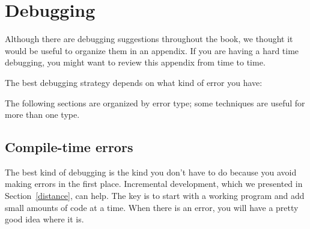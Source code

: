 \documentclass[12pt]{book}
\theoremstyle{exercise}
\newcommand{\java}{\verb}%}
\begin{document}
\chapter{Debugging}
\label{debugappendix}


Although there are debugging suggestions throughout the book, we thought it would be useful to organize them in an appendix.
If you are having a hard time debugging, you might want to review this appendix from time to time.

The best debugging strategy depends on what kind of error you have:


The following sections are organized by error type; some techniques are useful for more than one type.


\section{Compile-time errors}

The best kind of debugging is the kind you don't have to do because you avoid making errors in the first place.
Incremental development, which we presented in Section~\ref{distance}, can help.
The key is to start with a working program and add small amounts of code at a time.
When there is an error, you will have a pretty good idea where it is.
\end{document}
